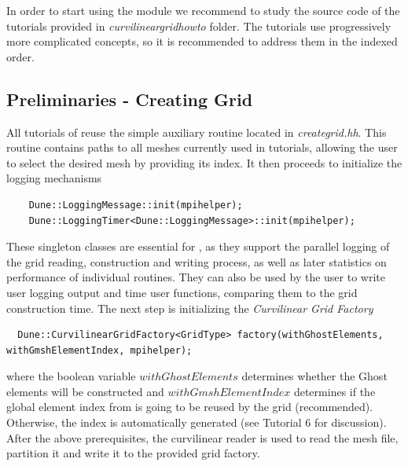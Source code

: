 \noindent
In order to start using the \curvgrid{} module we recommend to study the source code of the tutorials provided in \textit{curvilineargridhowto} folder. The tutorials use progressively more complicated concepts, so it is recommended to address them in the indexed order.


\subsection{Preliminaries - Creating Grid}
\label{usage-howto-tutorial-preliminaries}

All tutorials of \curvgrid{} reuse the simple auxiliary routine located in \textit{creategrid.hh}. This routine contains paths to all meshes currently used in tutorials, allowing the user to select the desired mesh by providing its index. It then proceeds to initialize the logging mechanisms
\begin{mybox}
\begin{lstlisting}
    Dune::LoggingMessage::init(mpihelper);
    Dune::LoggingTimer<Dune::LoggingMessage>::init(mpihelper);
\end{lstlisting}
\end{mybox}

\noindent
These singleton classes are essential for \curvgrid{}, as they support the parallel logging of the grid reading, construction and writing process, as well as later statistics on performance of individual routines. They can also be used by the user to write user logging output and time user functions, comparing them to the grid construction time. The next step is initializing the \textit{Curvilinear Grid Factory} \\

\begin{mybox}
\begin{lstlisting}
  Dune::CurvilinearGridFactory<GridType> factory(withGhostElements, withGmshElementIndex, mpihelper);
\end{lstlisting}
\end{mybox}

\noindent
where the boolean variable $withGhostElements$ determines whether the Ghost elements will be constructed and $withGmshElementIndex$ determines if the global element index from \gmsh{} is going to be reused by the grid (recommended). Otherwise, the index is automatically generated (see Tutorial 6 for discussion). After the above prerequisites, the curvilinear \gmsh{} reader is used to read the mesh file, partition it and write it to the provided grid factory.  \\

